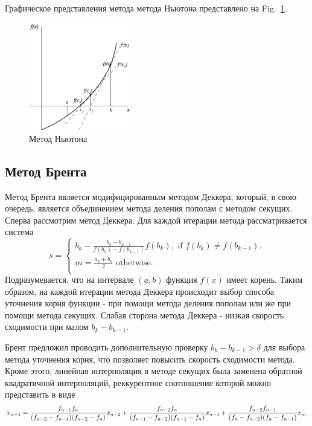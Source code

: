 \documentclass[
11pt,%
tightenlines,%
twoside,%
onecolumn,%
nofloats,%
nobibnotes,%
nofootinbib,%
superscriptaddress,%
noshowpacs,%
centertags]%
{revtex4}
\begin{document}
Графическое представления метода метода Ньютона представлено на Fig.~\ref{fig:newton}.
\newpage

\begin{figure}[ht!]
\setcaptionmargin{5mm}
\onelinecaptionstrue
\includegraphics[width=0.4\textwidth]{pics/newton.png}
\caption{Метод Ньютона}\label{fig:newton}
\end{figure}

\subsection{Метод Брента}
Метод Брента является модифицированным методом Деккера, который, в свою очередь, является объединением метода деления пополам с методом секущих.
Сперва рассмотрим метод Деккера. Для каждой итерации метода рассматривается система
\begin{equation}
s=\begin{cases}
b_k - \frac{b_k-b_{k-1}}{f(b_k)-f(b_{k-1})}f(b_k), \text{ if $f(b_k) \neq f(b_{k-1})$}.\\
m = \frac{a_k+b_k}{2} \text{ otherwise}.\\
\end{cases}
\end{equation}
Подразумевается, что на интервале $(a,b)$ функция $f(x)$ имеет корень. Таким образом, на каждой итерации метода Деккера происходит выбор способа уточнения корня функции - при помощи метода деления пополам или же при помощи метода секущих. Слабая сторона метода Деккера - низкая скорость сходимости при малом $b_k-b_{k-1}$. 

Брент предложил проводить дополнительную проверку $b_k-b_{k-1} > \delta$ для выбора метода уточнения корня, что позволяет повысить скорость сходимости метода. Кроме этого, линейная интерполяция в методе секущих была заменена обратной квадратичной интерполяций, реккурентное соотношение которой можно представить в виде
\begin{equation}
x_{n+1}=\frac{f_{n-1}f_n}{(f_{n-2}-f_{n-1})(f_{n-2}-f_n)}x_{n-2}+ \\\frac{f_{n-2}f_n}{(f_{n-1}-f_{n-2})(f_{n-1}-f_n)}x_{n-1}+\frac{f_{n-2}f_{n-1}}{(f_{n}-f_{n-2})(f_{n}-f_{n-1})}x_{n}.
\end{equation}
\end{document}
